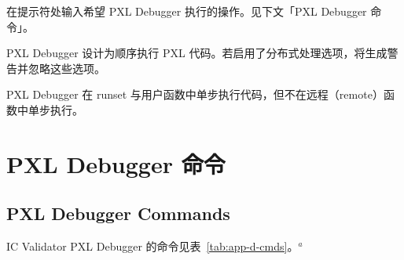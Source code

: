 在提示符处输入希望 PXL Debugger 执行的操作。见下文「PXL Debugger 命令」。

\begin{noteBox}
PXL Debugger 设计为顺序执行 PXL 代码。若启用了分布式处理选项，将生成警告并忽略这些选项。

PXL Debugger 在 runset 与用户函数中单步执行代码，但不在远程（remote）函数中单步执行。
\end{noteBox}

\section{PXL Debugger 命令}
\subsection*{PXL Debugger Commands}

IC Validator PXL Debugger 的命令见表~\ref{tab:app-d-cmds}。$^{a}$

